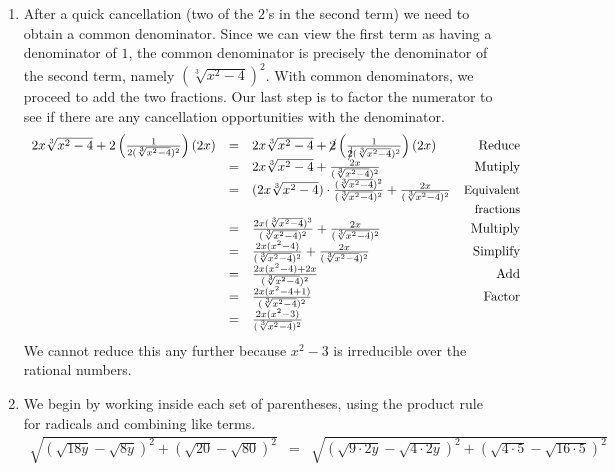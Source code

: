 \documentclass{ximera}
\begin{document}
\begin{example}
\begin{explanation}
\begin{enumerate}
\item After a quick cancellation (two of the $2$'s in the second term) we need to obtain a common denominator.  Since we can view the first term as having a denominator of $1$,  the common denominator is precisely the denominator of the second term, namely $(\sqrt[3]{x^2-4})^2$.  With common denominators, we proceed to add the two fractions.  Our last step is to factor the numerator to see if there are any cancellation opportunities with the denominator.\[ \begin{array}{rclr}

2x \sqrt[3]{x^2-4} + 2\left(\frac{1}{2(\sqrt[3]{x^2-4})^2}\right)  (2x) & = & 2x \sqrt[3]{x^2-4} + \cancel{2}\left(\frac{1}{\cancel{2}(\sqrt[3]{x^2-4})^2}\right)  (2x) & \text{Reduce}\\  

& = & 2x \sqrt[3]{x^2-4} + \frac{2x}{(\sqrt[3]{x^2-4})^2} & \text{Mutiply} \\ 

& = & (2x \sqrt[3]{x^2-4}) \cdot \frac{(\sqrt[3]{x^2-4})^2}{(\sqrt[3]{x^2-4})^2} + \frac{2x}{(\sqrt[3]{x^2-4})^2} & \text{\small Equivalent} \\  
&   & & \text{\small fractions} \\

& = & \frac{2x(\sqrt[3]{x^2-4})^3}{(\sqrt[3]{x^2-4})^2} + \frac{2x}{(\sqrt[3]{x^2-4})^2} & \text{Multiply}\\ 

& = & \frac{2x(x^2-4)}{(\sqrt[3]{x^2-4})^2} + \frac{2x}{(\sqrt[3]{x^2-4})^2} & \text{Simplify}\\  

& = & \frac{2x(x^2-4) + 2x}{(\sqrt[3]{x^2-4})^2} & \text{Add} \\  


& = & \frac{2x(x^2-4 +1)}{(\sqrt[3]{x^2-4})^2} & \text{Factor}\\  


& = & \frac{2x(x^2-3)}{(\sqrt[3]{x^2-4})^2} & \\

\end{array}\] We cannot reduce this any further because $x^2 - 3$ is irreducible over the rational numbers. 


\item  We begin by working inside each set of parentheses, using the product rule for radicals and combining like terms.\[ \begin{array}{rclr}


 \sqrt{(\sqrt{18y} - \sqrt{8y})^2 + (\sqrt{20} - \sqrt{80})^2} & = & \sqrt{(\sqrt{9\cdot 2y} - \sqrt{4 \cdot 2y})^2 + (\sqrt{4\cdot 5} - \sqrt{16 \cdot 5})^2} & \\ 


\end{array}\]
\end{enumerate}
\end{explanation}
\end{example}
\end{document}
